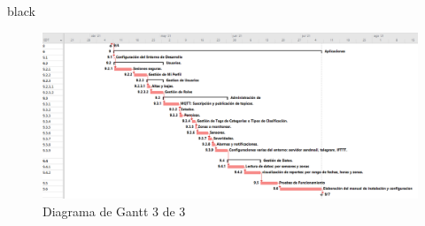 \documentclass[11pt]{charter}
\begin{document}
\begin{landscape}
\begin{consigna}{black}
\begin{figure}[htpb]
	\centering 
	\includegraphics[width=1.4\textwidth]{./Figuras/gantt03.png}
	\caption{Diagrama de Gantt 3 de 3}
	\label{fig:gantt03}
\end{figure}
\vspace{5px}
\newpage

\end{consigna}
\end{landscape}
\end{document}
